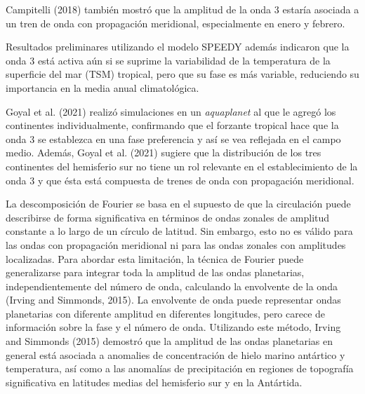 \documentclass[12pt,oneside]{reedthesis}
\begin{document}
Campitelli (2018) también mostró que la amplitud de la onda 3 estaría asociada a un tren de onda con propagación meridional, especialmente en enero y febrero.

Resultados preliminares utilizando el modelo SPEEDY además indicaron que la onda 3 está activa aún si se suprime la variabilidad de la temperatura de la superficie del mar (TSM) tropical, pero que su fase es más variable, reduciendo su importancia en la media anual climatológica.

Goyal et al. (2021) realizó simulaciones en un \emph{aquaplanet} al que le agregó los continentes individualmente, confirmando que el forzante tropical hace que la onda 3 se establezca en una fase preferencia y así se vea reflejada en el campo medio.
Además, Goyal et al. (2021) sugiere que la distribución de los tres continentes del hemisferio sur no tiene un rol relevante en el establecimiento de la onda 3 y que ésta está compuesta de trenes de onda con propagación meridional.

La descomposición de Fourier se basa en el supuesto de que la circulación puede describirse de forma significativa en términos de ondas zonales de amplitud constante a lo largo de un círculo de latitud.
Sin embargo, esto no es válido para las ondas con propagación meridional ni para las ondas zonales con amplitudes localizadas.
Para abordar esta limitación, la técnica de Fourier puede generalizarse para integrar toda la amplitud de las ondas planetarias, independientemente del número de onda, calculando la envolvente de la onda (Irving and Simmonds, 2015).
La envolvente de onda puede representar ondas planetarias con diferente amplitud en diferentes longitudes, pero carece de información sobre la fase y el número de onda.
Utilizando este método, Irving and Simmonds (2015) demostró que la amplitud de las ondas planetarias en general está asociada a anomalies de concentración de hielo marino antártico y temperatura, así como a las anomalías de precipitación en regiones de topografía significativa en latitudes medias del hemisferio sur y en la Antártida.
\end{document}
